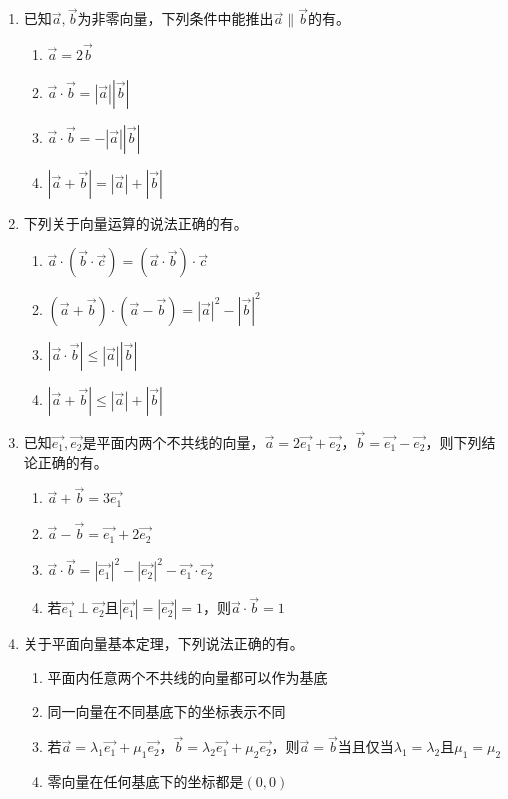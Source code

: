 \documentclass[12pt, a4paper]{ctexart}
\newcommand{\blank}[1]{\underline{\hspace{#1}}}
\begin{document}
\begin{enumerate}[start=9]
\item 已知$\vec{a},\vec{b}$为非零向量，下列条件中能推出$\vec{a}\parallel\vec{b}$的有\blank{3cm}。
\begin{enumerate}[label=\Alph*.]
\item $\vec{a}=2\vec{b}$
\item $\vec{a}\cdot\vec{b}=|\vec{a}||\vec{b}|$
\item $\vec{a}\cdot\vec{b}=-|\vec{a}||\vec{b}|$
\item $|\vec{a}+\vec{b}|=|\vec{a}|+|\vec{b}|$
\end{enumerate}

\item 下列关于向量运算的说法正确的有\blank{3cm}。
\begin{enumerate}[label=\Alph*.]
\item $\vec{a}\cdot(\vec{b}\cdot\vec{c})=(\vec{a}\cdot\vec{b})\cdot\vec{c}$
\item $(\vec{a}+\vec{b})\cdot(\vec{a}-\vec{b})=|\vec{a}|^2-|\vec{b}|^2$
\item $|\vec{a}\cdot\vec{b}|\leq|\vec{a}||\vec{b}|$
\item $|\vec{a}+\vec{b}|\leq|\vec{a}|+|\vec{b}|$
\end{enumerate}

\item 已知$\vec{e_1},\vec{e_2}$是平面内两个不共线的向量，$\vec{a}=2\vec{e_1}+\vec{e_2}$，$\vec{b}=\vec{e_1}-\vec{e_2}$，则下列结论正确的有\blank{3cm}。
\begin{enumerate}[label=\Alph*.]
\item $\vec{a}+\vec{b}=3\vec{e_1}$
\item $\vec{a}-\vec{b}=\vec{e_1}+2\vec{e_2}$
\item $\vec{a}\cdot\vec{b}=|\vec{e_1}|^2-|\vec{e_2}|^2-\vec{e_1}\cdot\vec{e_2}$
\item 若$\vec{e_1}\perp\vec{e_2}$且$|\vec{e_1}|=|\vec{e_2}|=1$，则$\vec{a}\cdot\vec{b}=1$
\end{enumerate}

\item 关于平面向量基本定理，下列说法正确的有\blank{3cm}。
\begin{enumerate}[label=\Alph*.]
\item 平面内任意两个不共线的向量都可以作为基底
\item 同一向量在不同基底下的坐标表示不同
\item 若$\vec{a}=\lambda_1\vec{e_1}+\mu_1\vec{e_2}$，$\vec{b}=\lambda_2\vec{e_1}+\mu_2\vec{e_2}$，则$\vec{a}=\vec{b}$当且仅当$\lambda_1=\lambda_2$且$\mu_1=\mu_2$
\item 零向量在任何基底下的坐标都是$(0,0)$
\end{enumerate}
\end{enumerate}
\end{document}
